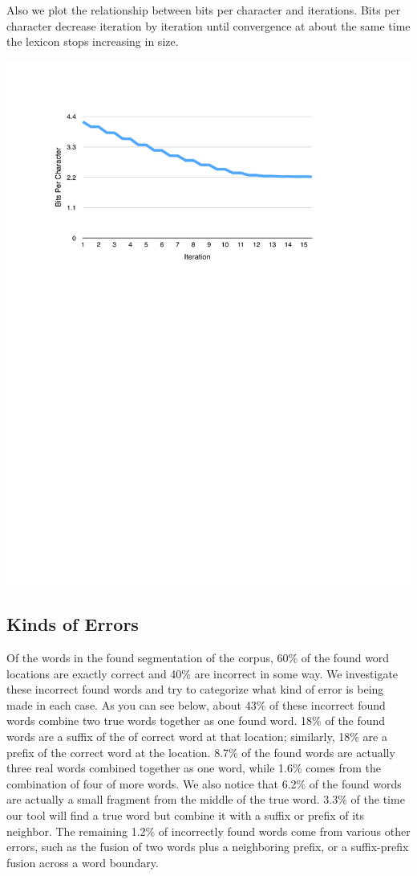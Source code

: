 \documentclass[11pt, oneside, fleqn]{article}
\begin{document}
  Also we plot the relationship between bits per character and iterations. Bits per character decrease iteration by iteration until convergence at about the same time the lexicon stops increasing in size.

  \includegraphics{./figure/bit_of_char_per_iteration.pdf}

  \subsection{Kinds of Errors}

	Of the words in the found segmentation of the corpus, 60\% of the found word locations are exactly correct and 40\% are incorrect in some way. We investigate these incorrect found words and try to categorize what kind of error is being made in each case. As you can see below, about 43\% of these incorrect found words combine two true words together as one found word. 18\% of the found words are a suffix of the of correct word at that location; similarly, 18\% are a prefix of the correct word at the location. 8.7\% of the found words are actually three real words combined together as one word, while 1.6\% comes from the combination of four of more words. We also notice that 6.2\% of the found words are actually a small fragment from the middle of the true word. 3.3\% of the time our tool will find a true word but combine it with a suffix or prefix of its neighbor. The remaining 1.2\% of incorrectly found words come from various other errors, such as the fusion of two words plus a neighboring prefix, or a suffix-prefix fusion across a word boundary.
\end{document}
